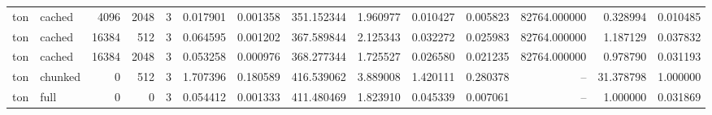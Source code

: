 \begin{tabular}{llrrrrrrrrrrrr}
ton & cached & 4096 & 2048 & 3 & 0.017901 & 0.001358 & 351.152344 & 1.960977 & 0.010427 & 0.005823 & 82764.000000 & 0.328994 & 0.010485 \\
ton & cached & 16384 & 512 & 3 & 0.064595 & 0.001202 & 367.589844 & 2.125343 & 0.032272 & 0.025983 & 82764.000000 & 1.187129 & 0.037832 \\
ton & cached & 16384 & 2048 & 3 & 0.053258 & 0.000976 & 368.277344 & 1.725527 & 0.026580 & 0.021235 & 82764.000000 & 0.978790 & 0.031193 \\
ton & chunked & 0 & 512 & 3 & 1.707396 & 0.180589 & 416.539062 & 3.889008 & 1.420111 & 0.280378 & -- & 31.378798 & 1.000000 \\
ton & full & 0 & 0 & 3 & 0.054412 & 0.001333 & 411.480469 & 1.823910 & 0.045339 & 0.007061 & -- & 1.000000 & 0.031869 \\
\bottomrule
\end{tabular}
